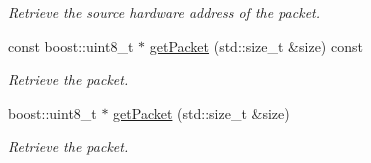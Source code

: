 \begin{DoxyCompactItemize}
\begin{DoxyCompactList}\small\item\em \-Retrieve the source hardware address of the packet. \end{DoxyCompactList}\item 
const boost\-::uint8\-\_\-t $\ast$ \hyperlink{classIPQ_1_1IpqPacket_a6dd7baeec66082658d882bff8862eb6c}{get\-Packet} (std\-::size\-\_\-t \&size) const 
\begin{DoxyCompactList}\small\item\em \-Retrieve the packet. \end{DoxyCompactList}\item 
boost\-::uint8\-\_\-t $\ast$ \hyperlink{classIPQ_1_1IpqPacket_a0bf3344a9eed5e2f6bc20890ffffe26e}{get\-Packet} (std\-::size\-\_\-t \&size)
\begin{DoxyCompactList}\small\item\em \-Retrieve the packet. \end{DoxyCompactList}\end{DoxyCompactItemize}
